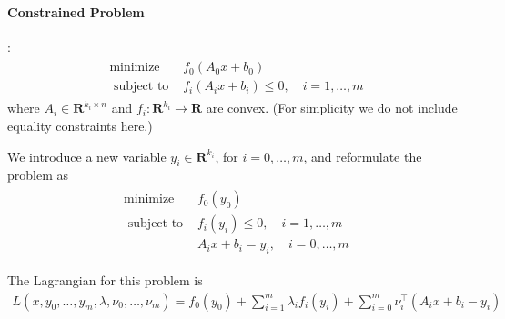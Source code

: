 \documentclass{article}
\begin{document}
\paragraph{Constrained Problem}
:
\begin{align}
\begin{array}{ll}
\operatorname{minimize} & f_{0}\left(A_{0} x+b_{0}\right) \\
\text { subject to } & f_{i}\left(A_{i} x+b_{i}\right) \leq 0, \quad i=1, \ldots, m
\end{array}\label{eq:okqdnc}
\end{align}
where $A_{i} \in \mathbf{R}^{k_{i} \times n}$ and $f_{i}: \mathbf{R}^{k_{i}} \rightarrow \mathbf{R}$ are convex. (For simplicity we do not include equality constraints here.) 


We introduce a new variable $y_{i} \in \mathbf{R}^{k_{i}}$, for $i=0, \ldots, m$, and reformulate the problem as
\begin{align*}
\begin{array}{ll}
\operatorname{minimize} & f_{0}\left(y_{0}\right) \\
\text { subject to } & f_{i}\left(y_{i}\right) \leq 0, \quad i=1, \ldots, m \\
& A_{i} x+b_{i}=y_{i}, \quad i=0, \ldots, m
\end{array}
\end{align*}


The Lagrangian for this problem is
\begin{align*}
L\left(x, y_{0}, \ldots, y_{m}, \lambda, \nu_{0}, \ldots, \nu_{m}\right)=f_{0}\left(y_{0}\right)+\sum_{i=1}^{m} \lambda_{i} f_{i}\left(y_{i}\right)+\sum_{i=0}^{m} \nu_{i}^{\top}\left(A_{i} x+b_{i}-y_{i}\right)
\end{align*}
\end{document}
